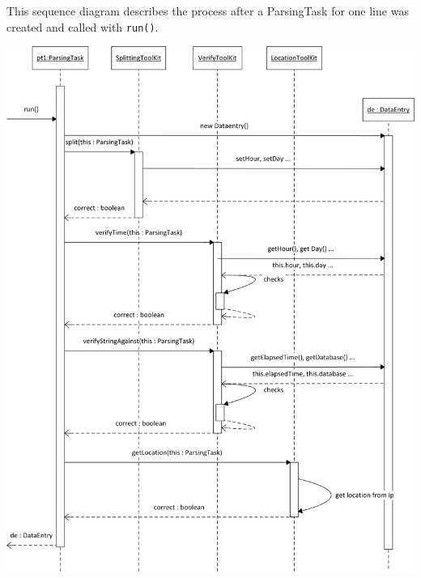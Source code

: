 \newpage
This sequence diagram describes the process after a ParsingTask for one line was created and
called with \texttt{run()}. 
\begin{center}
\includegraphics[width=0.8\linewidth]{Pictures/Seq/SeqParser.png}
\end{center}



    

